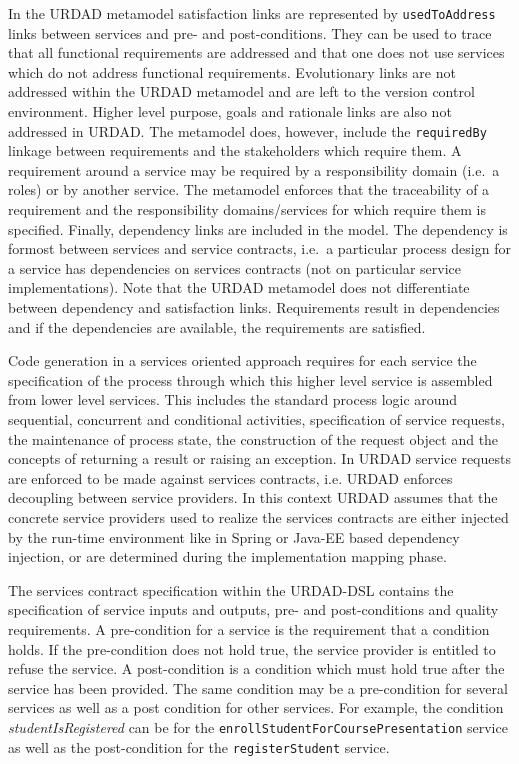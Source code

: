 In the URDAD metamodel satisfaction links are represented by \verb+usedToAddress+ links between services and pre- and post-conditions. They can be used to trace that all functional requirements are addressed and that one does not use services which do not address functional requirements. Evolutionary links are not addressed within the URDAD metamodel and are left to the version control environment. Higher level purpose, goals and rationale links are also not addressed in URDAD. The metamodel does, however, include the \verb+requiredBy+ linkage between requirements and the stakeholders which require them. A requirement around a service may be required by a responsibility domain (i.e.\ a roles) or by another service. The metamodel enforces that the traceability of a requirement and the responsibility domains/services for which require them is specified. Finally, dependency links are included in the model. The dependency is formost between services and service contracts, i.e.\ a particular process design for a service has dependencies on services contracts (not on particular service implementations). Note that the URDAD metamodel does not differentiate between dependency and satisfaction links. Requirements result in dependencies and if the dependencies are available, the requirements are satisfied.

Code generation in a services oriented approach requires for each service the specification of the process through which this higher level service is assembled from lower level services. This includes the standard process logic around sequential, concurrent and conditional activities, specification of service requests, the maintenance of process state, the construction of the request object and the concepts of returning a result or raising an exception. In URDAD service requests are enforced to be made against services contracts, i.e. URDAD enforces decoupling between service providers. In this context URDAD assumes that the concrete service providers used to realize the services contracts are either injected by the run-time environment like in Spring or Java-EE based dependency injection, or are determined during the implementation mapping phase.

The services contract specification within the URDAD-DSL contains the specification of service inputs and outputs, pre- and post-conditions and quality requirements. A pre-condition for a service is the requirement that a condition holds. If the pre-condition does not hold true, the service provider is entitled to refuse the service. A post-condition is a condition which must hold true after the service has been provided. The same condition may be a pre-condition for several services as well as a post condition for other services. For example, the condition \emph{studentIsRegistered} can be for the \verb+enrollStudentForCoursePresentation+ service as well as the post-condition for the \verb+registerStudent+ service. 

